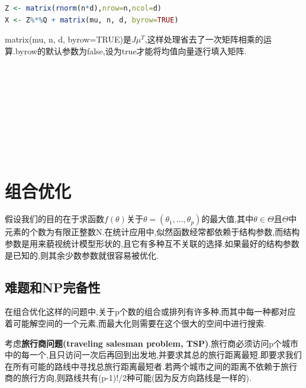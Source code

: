 \documentclass[11pt,a4paper,oneside]{book}
\begin{document}
\begin{lstlisting}[language=r]
Z <- matrix(rnorm(n*d),nrow=n,ncol=d)
X <- Z%*%Q + matrix(mu, n, d, byrow=TRUE)
\end{lstlisting}
\begin{tcolorbox}[colback=pink!10!white,colframe=pink!100!black]
matrix(mu, n, d, byrow=TRUE)是$ J\mu^T$,这样处理省去了一次矩阵相乘的运算.byrow的默认参数为false,设为true才能将均值向量逐行填入矩阵.
\end{tcolorbox}
\begin{lstlisting}[language=r]
	
\end{lstlisting}
\begin{lstlisting}[language=r]
	
\end{lstlisting}
\begin{lstlisting}[language=r]
	
\end{lstlisting}
\begin{lstlisting}[language=r]
	
\end{lstlisting}
\begin{lstlisting}[language=r]
	
\end{lstlisting}

\chapter{组合优化}
假设我们的目的在于求函数$ f(\theta) $关于$ \theta=(\theta_1,...,\theta_p) $的最大值,其中$ \theta\in\Theta $且$ \Theta $中元素的个数为有限正整数N.在统计应用中,似然函数经常都依赖于结构参数,而结构参数是用来藐视统计模型形状的,且它有多种互不关联的选择.如果最好的结构参数是已知的,则其余少数参数就很容易被优化.

\section{难题和NP完备性}
在组合优化这样的问题中,关于p个数的组合或排列有许多种,而其中每一种都对应着可能解空间的一个元素,而最大化则需要在这个很大的空间中进行搜索.

考虑\textbf{旅行商问题(traveling salesman problem, TSP)}.旅行商必须访问p个城市中的每一个,且只访问一次后再回到出发地,并要求其总的旅行距离最短.即要求我们在所有可能的路线中寻找总旅行距离最短者.若两个城市之间的距离不依赖于旅行商的旅行方向,则路线共有(p-1)!/2种可能(因为反方向路线是一样的).
\end{document}
